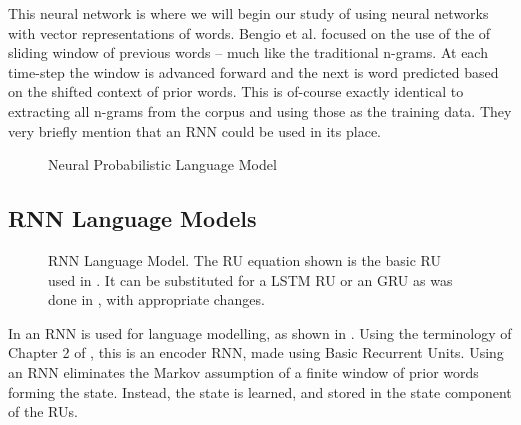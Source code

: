 {This neural network is where we will begin our study of using neural networks with vector representations of words.
Bengio et al. focused on the use of the of sliding window of previous words -- much like the traditional n-grams.
At each time-step the window is advanced forward and the next is word predicted based on the shifted context of prior words.
This is of-course exactly identical to extracting all n-grams from the corpus and using those as the training data.
They very briefly mention that an RNN could be used in its place.

\begin{figure}
	\caption{Neural Probabilistic Language Model}
	\label{fig:neural-language-model}
	\centering
	 
\end{figure}


\subsection{RNN Language Models}
\begin{figure}
	\caption{RNN Language Model. The RU equation shown is the basic RU used in \textcite{mikolov2010recurrent}.
	It can be substituted for a LSTM RU or an GRU as was done in \textcite{sundermeyer2012lstm,jozefowicz2015empirical}, with appropriate changes.
	}
	\label{fig:rnn-neural-language-model}
	\centering
	\resizebox{\textwidth}{!}{}
\end{figure}


In  an RNN is used for language modelling, as shown in .
Using the terminology of Chapter 2 of , this is an encoder RNN, made using Basic Recurrent Units.
Using an RNN eliminates the Markov assumption of a finite window of prior words forming the state.
Instead, the state is learned, and stored in the state component of the RUs. 

}
